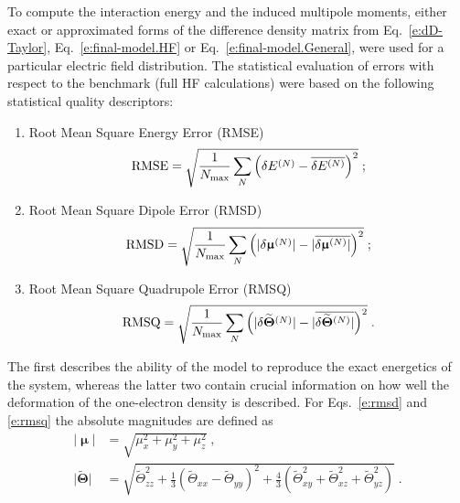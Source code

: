 \documentclass[aip,amsmath,amssymb,reprint,floatfix]{revtex4-1}
\newcommand{\BM}[1]{\bm{#1}}
\begin{document}
To compute the interaction energy and the induced multipole moments, either exact or approximated forms
of the difference density matrix from Eq.~\eqref{e:dD-Taylor}, Eq.~\eqref{e:final-model.HF} or Eq.~\eqref{e:final-model.General},
were used for a particular electric field distribution. The statistical evaluation of
errors with respect to the benchmark (full HF calculations) were based on 
the following statistical quality descriptors:
%
\begin{enumerate}
 \item Root Mean Square Energy Error (RMSE)
   \begin{equation}\label{e:rmse}
     {\rm RMSE} = \sqrt{ \frac{1}{N_{\rm max}} \sum_N \left( \delta E^{(N)} - \overline{\delta E^{(N)}}\right)^2 } \;;
   \end{equation}
 \item Root Mean Square Dipole Error (RMSD)
   \begin{equation}\label{e:rmsd}
     {\rm RMSD} = \sqrt{ \frac{1}{N_{\rm max}}\sum_N \left( \lvert \delta {\BM\upmu}^{(N)} \rvert 
                                             - \lvert \overline{\delta {\BM\upmu}^{(N)} \rvert }\right)^2 } \;;
   \end{equation}
 \item Root Mean Square Quadrupole Error (RMSQ)
   \begin{equation}\label{e:rmsq}
     {\rm RMSQ} = \sqrt{ \frac{1}{N_{\rm max}}\sum_N \left( \lvert \delta \widetilde{\BM\Theta}^{(N)} \rvert 
                                             - \lvert \overline{\delta \widetilde{\BM\Theta}^{(N)} \rvert }\right)^2 } \;.
   \end{equation}
\end{enumerate}
%
The first describes the ability of the model to reproduce the exact energetics of the system, 
whereas the latter two contain crucial information on how well the deformation of the one\hyp{}electron
density is described. For Eqs.~\eqref{e:rmsd} and \eqref{e:rmsq} the absolute magnitudes
are defined as
%
\begin{subequations}\label{e:absmagn}
  \begin{align}
   \lvert {\BM\upmu} \rvert &= \sqrt{\mu_x^2+\mu_y^2+\mu_z^2} \;,\\
   \lvert {\widetilde{\BM\Theta}}\rvert &= 
          \sqrt{\widetilde{\Theta}_{zz}^2 + \frac{1}{3}\left(\widetilde{\Theta}_{xx}-\widetilde{\Theta}_{yy}\right)^2 
          + \frac{4}{3}\left( \widetilde{\Theta}_{xy}^2 + \widetilde{\Theta}_{xz}^2 + \widetilde{\Theta}_{yz}^2 \right)} \;. 
  \end{align}
\end{subequations}
\end{document}
